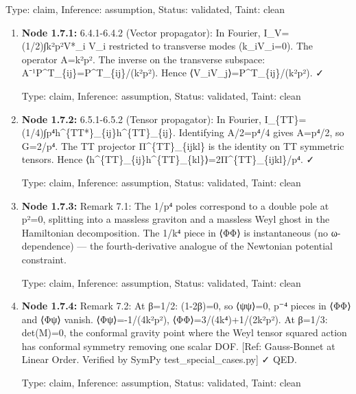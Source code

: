 \begin{enumerate}
  Type: claim, Inference: assumption, Status: validated, Taint: clean

\begin{enumerate}
\item \textbf{Node 1.7.1:} 6.4.1-6.4.2 (Vector propagator): In Fourier, I\_V=(1/2)∫k²p²V*\_i V\_i restricted to transverse modes (k\_iV\_i=0). The operator A=k²p². The inverse on the transverse subspace: A⁻¹P\textasciicircum{}T\_\{ij\}=P\textasciicircum{}T\_\{ij\}/(k²p²). Hence ⟨V\_iV\_j⟩=P\textasciicircum{}T\_\{ij\}/(k²p²). ✓

  Type: claim, Inference: assumption, Status: validated, Taint: clean

\item \textbf{Node 1.7.2:} 6.5.1-6.5.2 (Tensor propagator): In Fourier, I\_\{TT\}=(1/4)∫p⁴h\textasciicircum{}\{TT*\}\_\{ij\}h\textasciicircum{}\{TT\}\_\{ij\}. Identifying A/2=p⁴/4 gives A=p⁴/2, so G=2/p⁴. The TT projector Π\textasciicircum{}\{TT\}\_\{ijkl\} is the identity on TT symmetric tensors. Hence ⟨h\textasciicircum{}\{TT\}\_\{ij\}h\textasciicircum{}\{TT\}\_\{kl\}⟩=2Π\textasciicircum{}\{TT\}\_\{ijkl\}/p⁴. ✓

  Type: claim, Inference: assumption, Status: validated, Taint: clean

\item \textbf{Node 1.7.3:} Remark 7.1: The 1/p⁴ poles correspond to a double pole at p²=0, splitting into a massless graviton and a massless Weyl ghost in the Hamiltonian decomposition. The 1/k⁴ piece in ⟨ΦΦ⟩ is instantaneous (no ω-dependence) — the fourth-derivative analogue of the Newtonian potential constraint.

  Type: claim, Inference: assumption, Status: validated, Taint: clean

\item \textbf{Node 1.7.4:} Remark 7.2: At β=1/2: (1-2β)=0, so ⟨ψψ⟩=0, p⁻⁴ pieces in ⟨ΦΦ⟩ and ⟨Φψ⟩ vanish. ⟨Φψ⟩=-1/(4k²p²), ⟨ΦΦ⟩=3/(4k⁴)+1/(2k²p²). At β=1/3: det(M)=0, the conformal gravity point where the Weyl tensor squared action has conformal symmetry removing one scalar DOF. [Ref: Gauss-Bonnet at Linear Order. Verified by SymPy test\_special\_cases.py] ✓ QED.

  Type: claim, Inference: assumption, Status: validated, Taint: clean

\end{enumerate}
\end{enumerate}

